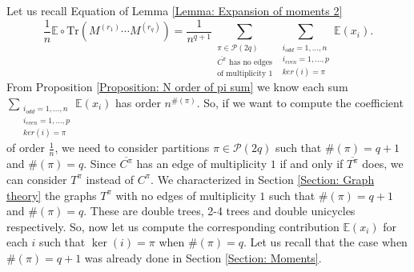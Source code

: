 \documentclass{article}
\theoremstyle{definition}
\newcommand{\E}{\mathbb{E}}
\newcommand{\cP}{\mathcal{P}}
\newcommand{\Tr}{\text{Tr}}
\begin{document}
{Let us recall Equation of Lemma \ref{Lemma: Expansion of moments 2}
\begin{equation}\label{Aux 7}
\frac{1}{n}\E\circ \Tr(M^{(r_1)}\cdots M^{(r_q)})=\frac{1}{n^{q+1}}\sum_{\substack{\pi\in \cP(2q)\\ \overline{C^\pi} \text{ has no edges} \\\text{of multiplicity }1}}\sum_{\substack{i_{odd}=1,\dots,n \\ i_{even}=1,\dots,p \\ ker(i)=\pi}}\E(x_i).
\end{equation}
From Proposition \ref{Proposition: N order of pi sum} we know each sum $\sum_{\substack{i_{odd}=1,\dots,n \\ i_{even}=1,\dots,p \\ ker(i)=\pi}}\E(x_i)$ has order $n^{\#(\pi)}$. So, if we want to compute the coefficient of order $\frac{1}{n}$, we need to consider partitions $\pi\in\cP(2q)$ such that $\#(\pi)=q+1$ and $\#(\pi)=q$. Since $\overline{C^\pi}$ has an edge of multiplicity $1$ if and only if $\overline{T^\pi}$ does, we can consider $T^\pi$ instead of $C^\pi$. We characterized in Section \ref{Section: Graph theory} the graphs $T^\pi$ with no edges of multiplicity $1$ such that $\#(\pi)=q+1$ and $\#(\pi)=q$. These are double trees, 2-4 trees and double unicycles respectively. So, now let us compute the corresponding contribution $\E(x_i)$ for each $i$ such that $\ker(i)=\pi$ when $\#(\pi)=q$. Let us recall that the case when $\#(\pi)=q+1$ was already done in Section \ref{Section: Moments}.

}
\end{document}
